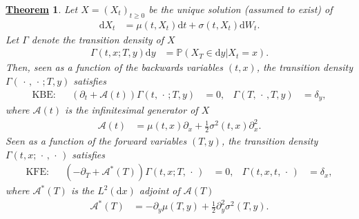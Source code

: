 \documentclass[12pt]{book}
\numberwithin{equation}{chapter}
\theoremstyle{plain}
\newtheorem{theorem}{\underline{Theorem}}
\numberwithin{theorem}{section}
\theoremstyle{definition}
\numberwithin{exercise}{chapter}
\newcommand{\<}{\langle}
\renewcommand{\>}{\rangle}
\renewcommand{\(}{\left(}
\renewcommand{\)}{\right)}
\renewcommand{\[}{\left[}
\renewcommand{\]}{\right]}
\newcommand\Pb{\mathds{P}}
\newcommand\Ac{\mathscr{A}}
\newcommand\sig{\sigma}
\newcommand\Gam{\Gamma}
\newcommand\del{\delta}
\renewcommand\d{\partial}
\newcommand\dd{\mathrm{d}}
\begin{document}
\begin{theorem}
Let $X = (X_t)_{t \geq 0}$ be the unique solution (assumed to exist) of
\begin{align}
\dd X_t
	&=	\mu(t,X_t) \dd t + \sig(t,X_t) \dd W_t .
\end{align}
Let $\Gam$ denote the transition density of $X$
\begin{align}
\Gam(t,x;T,y) \dd y
	&= \Pb(X_T \in \dd y | X_t = x ) .
\end{align}
Then, seen as a function of the backwards variables $(t,x)$, the transition density $\Gam(\,\cdot\,,\,\cdot\,;T,y)$ satisfies
\begin{align}
\text{KBE}:&&
 (\d_t + \Ac(t) ) \Gam(t,\,\cdot \,;T,y)
	&=	0 , &
\Gam(T,\,\cdot \,,T,y)
	&=	\del_y ,
\end{align}
where $\Ac(t)$ is the infinitesimal generator of $X$
\begin{align}
\Ac(t)
	&=	\mu(t,x) \d_x + \tfrac{1}{2} \sig^2(t,x) \d_x^2 .
\end{align}
Seen as a function of the forward variables $(T,y)$, the transition density $\Gam(t,x;\,\cdot\,,\,\cdot\,)$ satisfies
\begin{align}
\text{KFE}:&&
 (-\d_T + \Ac^*(T) ) \Gam(t,x;T,\,\cdot \,)
	&=	0 , &
\Gam(t,x,t,\,\cdot \,)
	&=	\del_x ,
\end{align}
where $\Ac^*(T)$ is the $L^2(\dd x)$ adjoint of $\Ac(T)$
\begin{align}
\Ac^*(T)
	&=	- \d_y \mu(T,y) + \tfrac{1}{2}  \d_y^2 \sig^2(T,y)  .
\end{align}
\end{theorem}
\end{document}
